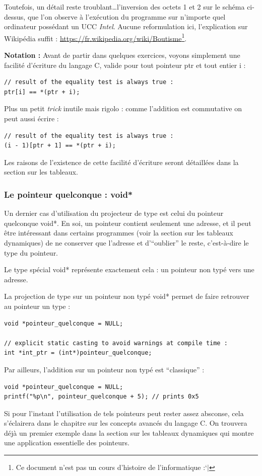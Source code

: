 \documentclass[../../../main.tex]{subfiles}
\begin{document}
Toutefois, un détail reste troublant\dots l'inversion des octets 1 et 2 sur le schéma ci-dessus, que l'on observe à l'exécution du programme sur n'importe quel ordinateur possédant un UCC \textit{Intel}. 
Aucune reformulation ici, l'explication sur Wikipédia suffit : \url{https://fr.wikipedia.org/wiki/Boutisme}\footnote{Ce document n'est pas un cours d'histoire de l'informatique :`$|$}.
 
\textbf{Notation :} Avant de partir dans quelques exercices, voyons simplement une facilité d'écriture du langage C, valide pour tout pointeur \textsf{ptr} et tout entier \textsf{i} :
\begin{verbatim}
// result of the equality test is always true :
ptr[i] == *(ptr + i);
\end{verbatim}
Plus un petit \textit{trick} inutile mais rigolo : comme l'addition est commutative on peut aussi écrire :
\begin{verbatim}
// result of the equality test is always true :
(i - 1)[ptr + 1] == *(ptr + i);
\end{verbatim}
Les raisons de l'existence de cette facilité d'écriture seront détaillées dans la section sur les tableaux.
\subsubsection{Le pointeur quelconque : \textsf{void*}}
Un dernier cas d'utilisation du projecteur de type est celui du pointeur quelconque \textsf{void*}. En soi, un pointeur contient seulement une adresse, et il peut être intéressant dans certains programmes (voir la section sur les tableaux dynamiques) de ne conserver que l'adresse et d'``oublier'' le reste, c'est-à-dire le type du pointeur.
 
Le type spécial \textsf{void*} représente exactement cela : un pointeur non typé vers une adresse.
 
La projection de type sur un pointeur non typé \textsf{void*} permet de faire retrouver au pointeur un type :
\begin{verbatim}
void *pointeur_quelconque = NULL;

// explicit static casting to avoid warnings at compile time :
int *int_ptr = (int*)pointeur_quelconque; 
\end{verbatim}
Par ailleurs, l'addition sur un pointeur non typé est ``classique'' :
\begin{verbatim}
void *pointeur_quelconque = NULL;
printf("%p\n", pointeur_quelconque + 5); // prints 0x5
\end{verbatim}
Si pour l'instant l'utilisation de tels pointeurs peut rester assez absconse, cela s'éclairera dans le chapitre sur les concepts avancés du langage C. On trouvera déjà un premier exemple dans la section sur les tableaux dynamiques qui montre une application essentielle des pointeurs.
\end{document}
